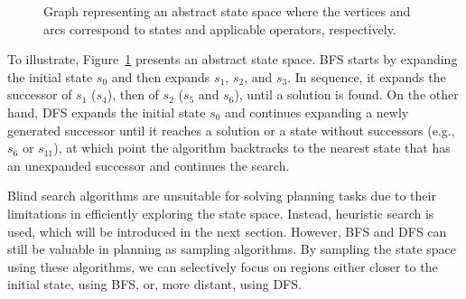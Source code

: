 \begin{figure}[t]
    \caption[Graph representing an abstract state space.]{Graph representing an abstract state space where the vertices and arcs correspond to states and applicable operators, respectively.}
    \label{fig:statespace}
    \addvspace{\baselineskip}
    \centering
\end{figure}

To illustrate, Figure~\ref{fig:statespace} presents an abstract state space. BFS starts by expanding the initial state $s_0$ and then expands $s_1$, $s_2$, and $s_3$. In sequence, it expands the successor of $s_1$ ($s_4$), then of $s_2$ ($s_5$ and $s_6$), until a solution is found. On the other hand, DFS expands the initial state $s_0$ and continues expanding a newly generated successor until it reaches a solution or a state without successors (e.g., $s_6$ or $s_{11}$), at which point the algorithm backtracks to the nearest state that has an unexpanded successor and continues the search.

Blind search algorithms are unsuitable for solving planning tasks due to their limitations in efficiently exploring the state space. Instead, heuristic search is used, which will be introduced in the next section. However, BFS and DFS can still be valuable in planning as sampling algorithms. By sampling the state space using these algorithms, we can selectively focus on regions either closer to the initial state, using BFS, or, more distant, using DFS.

